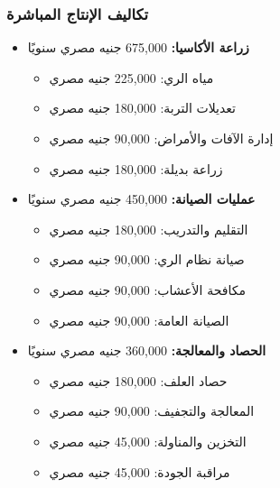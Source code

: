 \subsubsection{تكاليف الإنتاج المباشرة}
\begin{itemize}
    \item \textbf{زراعة الأكاسيا:} 675,000 جنيه مصري سنويًا
    \begin{itemize}
        \item مياه الري: 225,000 جنيه مصري
        \item تعديلات التربة: 180,000 جنيه مصري
        \item إدارة الآفات والأمراض: 90,000 جنيه مصري
        \item زراعة بديلة: 180,000 جنيه مصري
    \end{itemize}
    
    \item \textbf{عمليات الصيانة:} 450,000 جنيه مصري سنويًا
    \begin{itemize}
        \item التقليم والتدريب: 180,000 جنيه مصري
        \item صيانة نظام الري: 90,000 جنيه مصري
        \item مكافحة الأعشاب: 90,000 جنيه مصري
        \item الصيانة العامة: 90,000 جنيه مصري
    \end{itemize}
    
    \item \textbf{الحصاد والمعالجة:} 360,000 جنيه مصري سنويًا
    \begin{itemize}
        \item حصاد العلف: 180,000 جنيه مصري
        \item المعالجة والتجفيف: 90,000 جنيه مصري
        \item التخزين والمناولة: 45,000 جنيه مصري
        \item مراقبة الجودة: 45,000 جنيه مصري
    \end{itemize}
\end{itemize}


